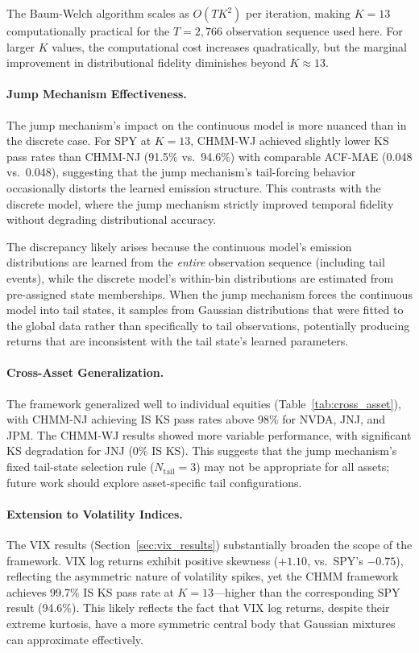 The Baum-Welch algorithm scales as $O(TK^2)$ per iteration, making $K = 13$ computationally practical for the $T = 2{,}766$ observation sequence used here.
For larger $K$ values, the computational cost increases quadratically, but the marginal improvement in distributional fidelity diminishes beyond $K \approx 13$.

\paragraph{Jump Mechanism Effectiveness.}
The jump mechanism's impact on the continuous model is more nuanced than in the discrete case.
For SPY at $K = 13$, CHMM-WJ achieved slightly lower KS pass rates than CHMM-NJ (91.5\% vs.\ 94.6\%) with comparable ACF-MAE (0.048 vs.\ 0.048), suggesting that the jump mechanism's tail-forcing behavior occasionally distorts the learned emission structure.
This contrasts with the discrete model, where the jump mechanism strictly improved temporal fidelity without degrading distributional accuracy.

The discrepancy likely arises because the continuous model's emission distributions are learned from the \emph{entire} observation sequence (including tail events), while the discrete model's within-bin distributions are estimated from pre-assigned state memberships.
When the jump mechanism forces the continuous model into tail states, it samples from Gaussian distributions that were fitted to the global data rather than specifically to tail observations, potentially producing returns that are inconsistent with the tail state's learned parameters.

\paragraph{Cross-Asset Generalization.}
The framework generalized well to individual equities (Table~\ref{tab:cross_asset}), with CHMM-NJ achieving IS KS pass rates above 98\% for NVDA, JNJ, and JPM.
The CHMM-WJ results showed more variable performance, with significant KS degradation for JNJ (0\% IS KS).
This suggests that the jump mechanism's fixed tail-state selection rule ($N_{\text{tail}} = 3$) may not be appropriate for all assets; future work should explore asset-specific tail configurations.

\paragraph{Extension to Volatility Indices.}
The VIX results (Section~\ref{sec:vix_results}) substantially broaden the scope of the framework.
VIX log returns exhibit positive skewness ($+1.10$, vs.\ SPY's $-0.75$), reflecting the asymmetric nature of volatility spikes, yet the CHMM framework achieves 99.7\% IS KS pass rate at $K = 13$---higher than the corresponding SPY result (94.6\%).
This likely reflects the fact that VIX log returns, despite their extreme kurtosis, have a more symmetric central body that Gaussian mixtures can approximate effectively.

